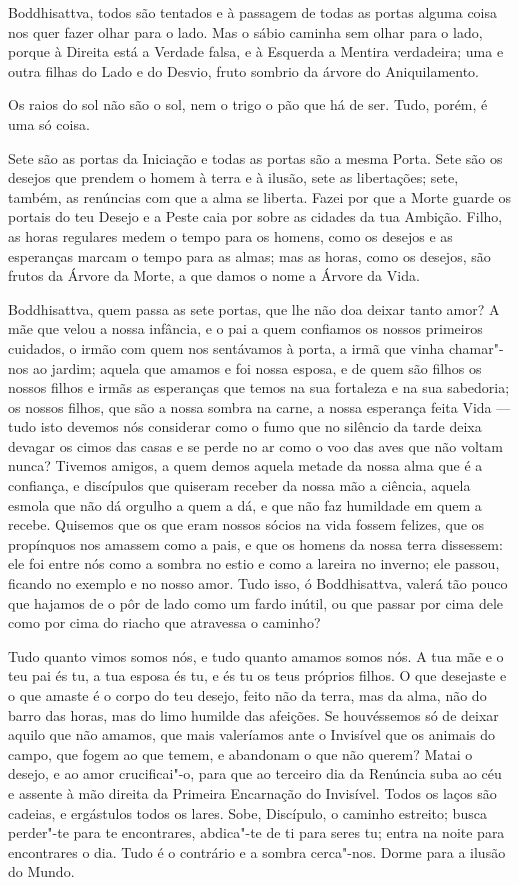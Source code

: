  Boddhisattva, todos são tentados e à passagem de todas as
portas alguma coisa nos quer fazer olhar para o lado. Mas o sábio
caminha sem olhar para o lado, porque à Direita está a Verdade falsa,
e à Esquerda a Mentira verdadeira; uma e outra filhas do Lado e do
Desvio, fruto sombrio da árvore do Aniquilamento.

 Os raios do sol não são o sol, nem o trigo o pão que há de
ser. Tudo, porém, é uma só coisa.

Sete são as portas da Iniciação e todas as portas são a mesma Porta.
Sete são os desejos que prendem o homem à terra e à ilusão, sete as
libertações; sete, também, as renúncias com que a alma se liberta.
Fazei por que a Morte guarde os portais do teu Desejo e a Peste caia
por sobre as cidades da tua Ambição. Filho, as horas regulares medem
o tempo para os homens, como os desejos e as esperanças marcam o
tempo para as almas; mas as horas, como os desejos, são frutos da
Árvore da Morte, a que damos o nome a Árvore da Vida.

Boddhisattva, quem passa as sete portas, que lhe não doa deixar tanto
amor? A mãe que velou a nossa infância, e o pai a quem confiamos os
nossos primeiros cuidados, o irmão com quem nos sentávamos à porta, a
irmã que vinha chamar"-nos ao jardim; aquela que amamos e foi nossa
esposa, e de quem são filhos os nossos filhos e irmãs as esperanças
que temos na sua fortaleza e na sua sabedoria; os nossos filhos, que
são a nossa sombra na carne, a nossa esperança feita Vida --- tudo isto
devemos nós considerar como o fumo que no silêncio da tarde deixa
devagar os cimos das casas e se perde no ar como o voo das aves que
não voltam nunca? Tivemos amigos, a quem demos aquela metade da nossa
alma que é a confiança, e discípulos que quiseram receber da nossa
mão a ciência, aquela esmola que não dá orgulho a quem a dá, e que
não faz humildade em quem a recebe. Quisemos que os que eram nossos
sócios na vida fossem felizes, que os propínquos nos amassem como a
pais, e que os homens da nossa terra dissessem: ele foi entre nós
como a sombra no estio e como a lareira no inverno; ele passou,
ficando no exemplo e no nosso amor. Tudo isso, ó Boddhisattva, valerá
tão pouco que hajamos de o pôr de lado como um fardo inútil, ou que
passar por cima dele como por cima do riacho que atravessa o caminho?

Tudo quanto vimos somos nós, e tudo quanto amamos somos nós. A tua mãe
e o teu pai és tu, a tua esposa és tu, e és tu os teus próprios
filhos. O que desejaste e o que amaste é o corpo do teu desejo, feito
não da terra, mas da alma, não do barro das horas, mas do limo
humilde das afeições. Se houvéssemos só de deixar aquilo que não
amamos, que mais valeríamos ante o Invisível que os animais do campo,
que fogem ao que temem, e abandonam o que não querem? Matai o desejo,
e ao amor crucificai"-o, para que ao terceiro dia da Renúncia suba ao
céu e assente à mão direita da Primeira Encarnação do Invisível.
Todos os laços são cadeias, e ergástulos todos os lares. Sobe,
Discípulo, o caminho estreito; busca perder"-te para te encontrares,
abdica"-te de ti para seres tu; entra na noite para encontrares o dia.
Tudo é o contrário e a sombra cerca"-nos. Dorme para a ilusão do
Mundo.

